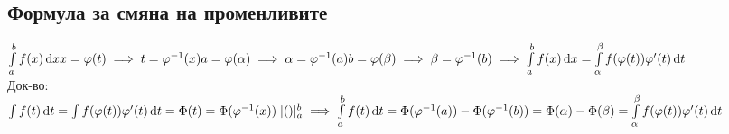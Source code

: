 \documentclass{article}
\newcommand{\dx}[1]{\,\mathrm{d}#1}
\newcommand{\intfromto}[2]{\int\limits_{#1}^{#2}}
\newcommand{\intfromatob}{\intfromto{a}{b}}
\begin{document}
    \subsection{Формула за смяна на променливите}
    \(\intfromatob f(x) \dx{x}\\
    x = \varphi(t) \implies t = \varphi^{-1}(x)\\
    a = \varphi(\alpha) \implies \alpha = \varphi^{-1}(a)\\
    b = \varphi(\beta) \implies \beta = \varphi^{-1}(b)\\
    \implies \intfromatob f(x) \dx{x} = \intfromto{\alpha}{\beta}f(\varphi(t)) \varphi'(t) \dx{t}\)\\
    Док-во:\\
    \(\int f(t) \dx{t} = \int f(\varphi(t)) \varphi'(t) \dx{t} = \Phi(t) = \Phi(\varphi^{-1}(x)) \; | ()|_a^b\\
    \implies \intfromatob f(t) \dx{t} = \Phi(\varphi^{-1}(a)) - \Phi(\varphi^{-1}(b)) = \Phi(\alpha) - \Phi(\beta) = \intfromto{\alpha}{\beta}f(\varphi(t)) \varphi'(t) \dx{t}\)
\end{document}

